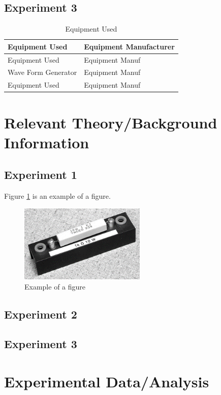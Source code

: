 \documentclass[a4paper]{article}
\begin{document}
\subsection{Experiment 3}
\begin{table}[H]
	\centering
	\caption{Equipment Used} %
	\label{EquipmentUsed3}
	\begin{tabular}{|l||l|}
		\hline
		\textbf{Equipment Used}       & \textbf{Equipment Manufacturer}               \\
		\hline
		Equipment Used & Equipment Manuf                         \\
		\hline
		Wave Form Generator  & Equipment Manuf                       \\
		\hline
		Equipment Used         & Equipment Manuf \\
		\hline
	\end{tabular}
\end{table}
\section{Relevant Theory/Background Information}

\subsection{Experiment 1}
\lipsum[1]
Figure \ref{fig} is an example of a figure.
\begin{figure}[H]\label{fig}
	\begin{center}
		\includegraphics[width=6cm]{fig}
	\end{center}
	\caption{Example of a figure}
\end{figure}
\subsection{Experiment 2}
\lipsum[1]
\subsection{Experiment 3}
\lipsum[1]
\section{Experimental Data/Analysis}
\end{document}

